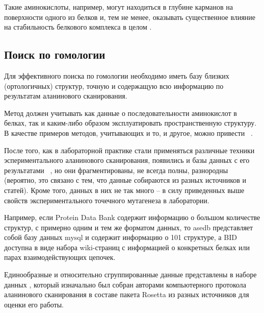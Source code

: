 Такие аминокислоты, например, могут находиться в глубине карманов на поверхности одного из белков и, тем не менее, оказывать существенное влияние на стабильность белкового комплекса в целом \cite{pockets2004}.

\newpage
\subsection{Поиск по гомологии}

Для эффективного поиска по гомологии необходимо иметь базу близких (ортологичных) структур, точную и содержащую всю информацию по результатам аланинового сканирования.

Метод должен учитывать как данные о последовательности аминокислот в белках, так и каким-либо образом эксплуатировать пространственную структуру. В качестве примеров методов, учитывающих и то, и другое, можно привести ~\cite{svm1, svm2, hmmsvm}.



После того, как в лабораторной практике стали применяться различные техники эспериментального аланинового сканирования, появились и базы данных с его результатами ~\cite{asedb2001, bid2003}, но они фрагментированы, не всегда полны, разнородны (вероятно, это связано с тем, что данные собираются из разных источников и статей). Кроме того, данных в них не так много -- в силу приведенных выше свойств экспериментального точечного мутагенеза в лаборатории.

Например, если Protein Data Bank содержит информацию о большом количестве структур, с примерно одним и тем же форматом данных, то asedb представляет собой базу данных mysql и содержит информацию о 101 структуре, а BID доступна в виде набора wiki-страниц с информацией о конкретных белках или парах взаимодействующих цепочек.

Единообразные и относительно сгруппированные данные представлены в наборе данных  \cite{kortemme_alascan_datasets}, который изначально был собран авторами компьютерного протокола аланинового сканирования в составе пакета Rosetta \cite{kortemme2002, kortemme2004} из разных источников для оценки его работы.